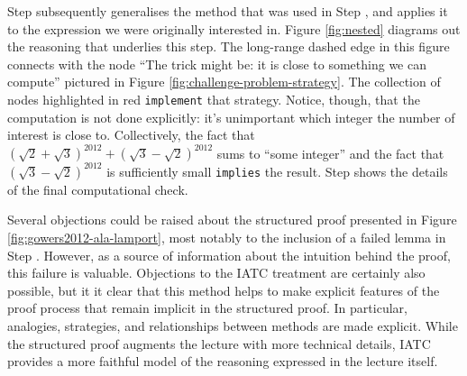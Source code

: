 \documentclass[smallextended,oneside]{svjour3}       %
\newcommand\nothing[1]{#1}
\let\paragraph\nothing
\begin{document}
Step  subsequently generalises the
method that was used in Step , and applies it to the
expression we were originally interested in.
Figure \ref{fig:nested} diagrams out the reasoning that underlies this step.
The long-range dashed edge in this figure connects with the
node ``The trick might be: it is close to something we can compute''
pictured in Figure \ref{fig:challenge-problem-strategy}.
The
collection of nodes highlighted in red \texttt{implement} that
strategy.  Notice, though, that the computation is not done explicitly:
it's unimportant which integer the number of interest is close to.
Collectively, the fact that
$(\sqrt{2}+\sqrt{3})^{2012}+(\sqrt{3}-\sqrt{2})^{2012}$
sums to ``some integer'' and the fact that $(\sqrt{3}-\sqrt{2})^{2012}$
is sufficiently small \texttt{implies} the result.
Step  shows the details of the final computational check.

\paragraph{Several objections could be raised about the structured proof presented in Figure \ref{fig:gowers2012-ala-lamport}, most notably to the inclusion of a failed lemma in Step \pfref{2}.}
However, as a source of information about the intuition behind the
proof, this failure is valuable.  Objections to the IATC treatment 
are certainly also possible, but it it clear that this method helps to 
make explicit features of the proof process that remain implicit in the
structured proof.  In particular,
analogies, strategies, and relationships between methods are
made explicit.  While the structured proof augments the lecture with
more technical details, IATC provides a more faithful model of the reasoning
expressed in the lecture itself.
\end{document}
